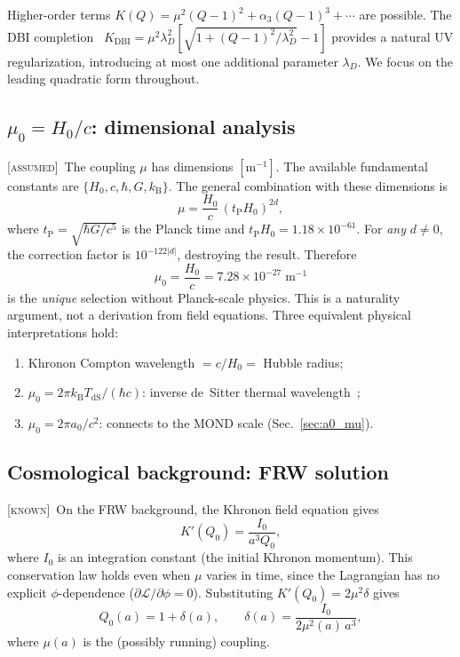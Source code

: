 \documentclass[prd,twocolumn,superscriptaddress,longbibliography,floatfix]{revtex4-2}
\newcommand{\kB}{k_{\mathrm{B}}}
\newcommand{\known}{\textsc{[known]}}
\newcommand{\assumed}{\textsc{[assumed]}}
\begin{document}
Higher-order terms $K(Q) = \mu^2(Q-1)^2 + \alpha_3(Q-1)^3 + \cdots$
are possible.  The DBI completion~\cite{BS2024}
$K_{\mathrm{DBI}} = \mu^2\lambda_D^2[\sqrt{1 + (Q-1)^2/\lambda_D^2} - 1]$
provides a natural UV regularization, introducing at most one
additional parameter $\lambda_D$.  We focus on the leading
quadratic form throughout.

\subsection{$\mu_0 = H_0/c$: dimensional analysis}
\label{sec:mu0}

\assumed\  The coupling $\mu$ has dimensions $[\mathrm{m}^{-1}]$.
The available fundamental constants are
$\{H_0, c, \hbar, G, \kB\}$.  The general combination with
these dimensions is~\cite{muSynthesis}
\begin{equation}
\mu = \frac{H_0}{c}\,\left(t_{\mathrm{P}} H_0\right)^{2d},
\label{eq:mu_general}
\end{equation}
where $t_{\mathrm{P}} = \sqrt{\hbar G/c^5}$ is the Planck time
and $t_{\mathrm{P}} H_0 = 1.18 \times 10^{-61}$.  For \emph{any}
$d \neq 0$, the correction factor is $10^{-122|d|}$, destroying
the result.  Therefore
\begin{equation}
\boxed{\mu_0 = \frac{H_0}{c} = 7.28 \times 10^{-27}\;\mathrm{m}^{-1}}
\label{eq:mu0}
\end{equation}
is the \emph{unique} selection without Planck-scale physics.  This
is a naturality argument, not a derivation from field equations.
Three equivalent physical interpretations hold:
\begin{enumerate}
\item Khronon Compton wavelength $= c/H_0 =$ Hubble radius;
\item $\mu_0 = 2\pi\kB T_{\mathrm{dS}}/(\hbar c)$: inverse
  de~Sitter thermal wavelength~\cite{GibbonsHawking1977};
\item $\mu_0 = 2\pi a_0/c^2$: connects to the MOND scale
  (Sec.~\ref{sec:a0_mu}).
\end{enumerate}

\subsection{Cosmological background: FRW solution}
\label{sec:FRW}

\known\  On the FRW background, the Khronon field equation
gives~\cite{BS2024}
\begin{equation}
K'(Q_0) = \frac{I_0}{a^3 Q_0},
\label{eq:khronon_FRW}
\end{equation}
where $I_0$ is an integration constant (the initial Khronon
momentum).  This conservation law holds even when $\mu$
varies in time, since the Lagrangian has no explicit
$\phi$-dependence ($\partial\mathcal{L}/\partial\phi = 0$).
Substituting $K'(Q_0) = 2\mu^2\delta$ gives
\begin{equation}
Q_0(a) = 1 + \delta(a), \qquad
\delta(a) = \frac{I_0}{2\mu^2(a)\,a^3},
\label{eq:delta}
\end{equation}
where $\mu(a)$ is the (possibly running) coupling.
\end{document}
